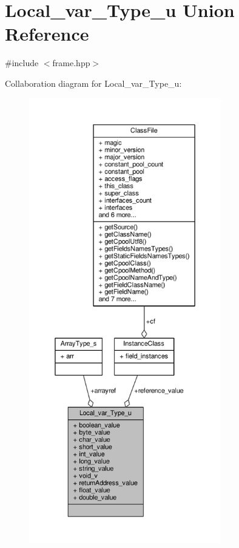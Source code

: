 \hypertarget{unionLocal__var__Type__u}{\section{Local\+\_\+var\+\_\+\+Type\+\_\+u Union Reference}
\label{unionLocal__var__Type__u}
}


{\ttfamily \#include $<$frame.\+hpp$>$}



Collaboration diagram for Local\+\_\+var\+\_\+\+Type\+\_\+u\+:
\nopagebreak
\begin{figure}[H]
\begin{center}
\leavevmode
\includegraphics[height=550pt]{unionLocal__var__Type__u__coll__graph}
\end{center}
\end{figure}
